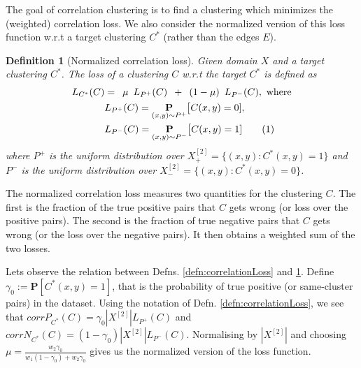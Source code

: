 \documentclass[12pt]{article}
\newtheorem{definition}[theorem]{Definition}
\newcommand{\mb}{\mathbf}
\newcommand\numberthis{\addtocounter{equation}{1}\tag{\theequation}}
\begin{document}
The goal of correlation clustering is to find a clustering which minimizes the (weighted) correlation loss. We also consider the normalized version of this loss function w.r.t a target clustering $C^*$ (rather than the edges $E$).

\begin{definition}[Normalized correlation loss]
\label{defn:normalizedCorrelationLoss}
Given domain $X$ and a target clustering $C^*$. The loss of a clustering $C$ w.r.t the target $C^*$ is defined as
\begin{align*}
  L_{C^*}(C) &= \enspace  \mu \enspace L_{P^+}(C) \enspace+\enspace (1-\mu) \enspace L_{P^-}(C), \text{ where} \\
  &L_{P^+}(C) = \underset{(x, y) \sim P^+}{\mb P} \big[ C(x, y) = 0 ],\\
  & L_{P^-}(C) = \underset{(x, y) \sim P^-}{\mb P} \big[ C(x, y) = 1] \numberthis\label{eqn:RCCV2}
\end{align*}
where $P^+$ is the uniform distribution over $X^{[2]}_+ = \{(x, y) : C^*(x, y) = 1\}$ and $P^-$ is the uniform distribution over $X^{[2]}_- = \{(x, y): C^*(x, y) = 0\}$. 
\end{definition}
The normalized correlation loss measures two quantities for the clustering $C$. The first is the fraction of the true positive pairs that $C$ gets wrong (or loss over the positive pairs). The second is the fraction of true negative pairs that $C$ gets wrong (or the loss over the negative pairs). It then obtains a weighted sum of the two losses. 
  
Lets observe the relation between Defns. \ref{defn:correlationLoss} and \ref{defn:normalizedCorrelationLoss}. Define $\gamma_0 := \mb P[C^*(x, y) = 1]$, that is the probability of true positive (or same-cluster pairs) in the dataset. Using the notation of Defn. \ref{defn:correlationLoss}, we see that $corrP_{C^*}(C) = \gamma_0|X^{[2]}| L_{P^+}(C)$ and $corrN_{C^*}(C) = (1-\gamma_0)|X^{[2]}| L_{P^-}(C)$. Normalising by $|X^{[2]}|$ and choosing $\mu = \frac{w_2 \gamma_0}{w_1 (1-\gamma_0) + w_2 \gamma_0}$ gives us the normalized version of the loss function.
\end{document}
